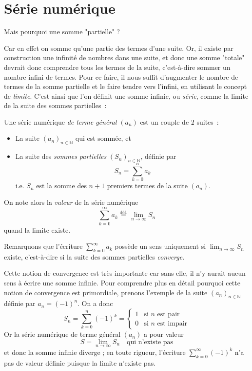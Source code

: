 \section{Série numérique}
\begin{greybox}
Mais pourquoi une somme "partielle" ?
\end{greybox}
Car en effet on somme qu'une partie des termes d'une suite. Or, il existe par construction une infinité de nombres dans une suite, et donc une somme "totale" devrait donc comprendre tous les termes de la suite, c'est-à-dire sommer un nombre infini de termes. Pour ce faire, il nous suffit d'augmenter le nombre de termes de la somme partielle et le faire tendre vers l'infini, en utilisant le concept de \emph{limite}. C'est ainsi que l'on définit une somme infinie, ou \emph{série}, comme la limite de la suite des sommes partielles~:
\begin{boxdef}
Une série numérique \emph{de terme général $(a_n)$} est un couple de 2 suites~:
\begin{itemize}
    \item La suite $(a_n)_{n \in \mathbb{N}}$ qui est sommée, et
    \item La suite des \emph{sommes partielles} $(S_n)_{n \in \mathbb{N}}$, définie par
    \begin{equation}
    S_n = \sum_{k = 0}^{n} a_k
    \end{equation}
    i.e. $S_n$ est la somme des $n+1$ premiers termes de la suite $(a_n)$.
\end{itemize}
On note alors la \emph{valeur} de la série numérique 
\begin{equation}
\sum_{k=0}^{\infty} a_k \stackrel{\textrm{déf.}}{=} \lim_{n \to \infty} S_n
\end{equation}
quand la limite existe.
\end{boxdef}
Remarquons que l'écriture $\displaystyle\sum_{k = 0}^{\infty} a_k$ possède un sens uniquement si $\displaystyle\lim_{n \to \infty} S_n$ existe, c'est-à-dire si la suite des sommes partielles \emph{converge}.

Cette notion de convergence est très importante car sans elle, il n'y aurait aucun sens à écrire une somme infinie. Pour comprendre plus en détail pourquoi cette notion de convergence est primordiale, prenons l'exemple de la suite $(a_n)_{n \in \mathbb{N}}$ définie par $a_n = (-1)^n$. On a donc
\begin{equation}
S_n = \sum_{k=0}^{n} (-1)^k = \begin{cases}
1 & \textrm{si } n \textrm{ est pair} \\
0 & \textrm{si } n \textrm{ est impair}
\end{cases}
\end{equation}
Or la série numérique de terme général $(a_n)$ a pour valeur
\[
S = \lim_{n \to \infty} S_n \quad \textrm{qui n'existe pas}
\] et donc la somme infinie diverge ; en toute rigueur, l'écriture $\displaystyle\sum_{k = 0}^{\infty} (-1)^k$ n'a pas de valeur définie puisque la limite n'existe pas.


